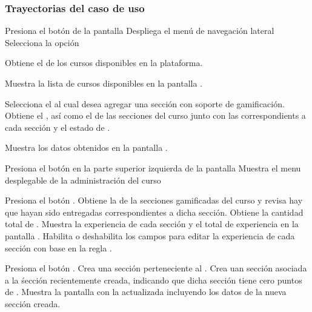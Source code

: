 \subsubsection{Trayectorias del caso de uso}

\begin{UCtrayectoria}%
%
  \Actor Presiona el botón \IUMenu de la pantalla 
  \Sistema Despliega el menú de navegación lateral
  \Actor Selecciona la opción 

  \Sistema Obtiene el  de los cursos disponibles en la
           plataforma.

  \Sistema Muestra la lista de cursos disponibles en la pantalla .

  \Actor Selecciona el  al cual desea agregar una sección con
         soporte de gamificación.
  \Sistema Obtiene el , 
           así como el  de las secciones 
           del curso junto con las  
           correspondients a cada sección y el estado de .

  \Sistema Muestra los datos obtenidos en la pantalla .
           \label{CU-E07-pantalla}

  \Actor Presiona el botón \IUAdminSitio en la parte superior izquierda de la pantalla
  \Sistema Muestra el menu desplegable de la administración del curso

  \Actor Presiona el botón . 
  \Sistema Obtiene la  de la secciones gamificadas del 
           curso y revisa hay  que hayan sido
           entregadas correspondientes a dicha sección.
  \Sistema Obtiene la cantidad total de .
  \Sistema Muestra la experiencia de cada sección y el total de experiencia 
           en la pantalla .
  \Sistema Habilita o deshabilita los campos para editar la experiencia de cada 
           sección con base en la regla .

  \Actor Presiona el botón .
  \Sistema Crea una sección  perteneciente al
           .
  \Sistema Crea uan sección  asociada a la śección
           recientemente creada, indicando que dicha sección tiene cero puntos de
           .
  \Sistema Muestra la pantalla  con la 
           actualizada incluyendo los datos de la nueva sección creada.

\end{UCtrayectoria}

